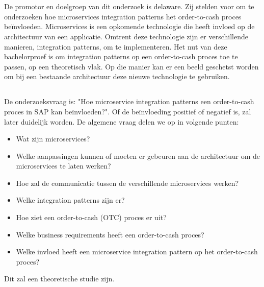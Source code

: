 
\chapter{}
\label{ch:inleiding}

\section{}
\label{sec:probleemstelling}
De promotor en doelgroep van dit onderzoek is delaware. Zij stelden voor om te onderzoeken hoe microservices integration patterns het order-to-cash proces beïnvloeden. Microservices is een opkomende technologie die heeft invloed op de architectuur van een applicatie. Omtrent deze technologie zijn er verschillende manieren, integration patterns, om te implementeren. Het nut van deze bachelorproef is om integration patterns op een order-to-cash proces toe te passen, op een theoretisch vlak. Op die manier kan er een beeld geschetst worden om bij een bestaande architectuur deze nieuwe technologie te gebruiken.

\section{}
\label{sec:onderzoeksvraag}
De onderzoeksvraag is: "Hoe microservice integration patterns een order-to-cash proces in SAP kan beïnvloeden?". Of de beïnvloeding positief of negatief is, zal later duidelijk worden. De algemene vraag delen we op in volgende punten:
\begin{itemize}
  \item Wat zijn microservices?
  \item Welke aanpassingen kunnen of moeten er gebeuren aan de architectuur om de microservices te laten werken?
  \item Hoe zal de communicatie tussen de verschillende microservices werken?
  \item Welke integration patterns zijn er?
  \item Hoe ziet een order-to-cash (OTC) proces er uit?
  \item Welke business requirements heeft een order-to-cash proces?
  \item Welke invloed heeft een microservice integration pattern op het order-to-cash proces?
\end{itemize}
Dit zal een theoretische studie zijn.

